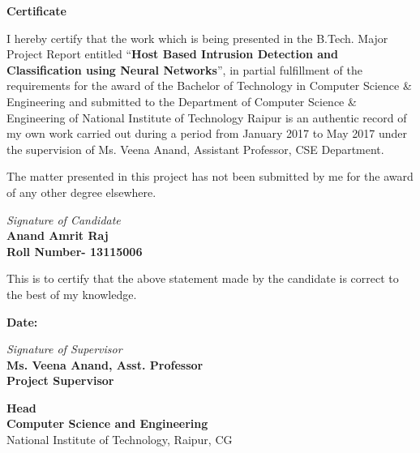 \documentclass[12pt]{article}
\newcommand{\projectTitle}{Host Based Intrusion Detection and Classification using Neural Networks}
\newcommand{\quotes}[1]{``#1''}
\theoremstyle{definition}
\begin{document}
	
	\begin{titlepage}
		
		\textbf{%
			\hfill
			\Large Certificate \hfill\hfill\\
		}
		\vspace{15pt}
		
		I hereby certify that the work which is being presented in the B.Tech. Major Project Report entitled \quotes{\textbf{\projectTitle}}, in partial fulfillment of the requirements for the award of the Bachelor  of Technology in Computer Science \& Engineering and submitted to the Department of Computer Science \& Engineering of National Institute of Technology Raipur  is an authentic record of my own work carried out during a period from January 2017 to May 2017 under the supervision of  Ms. Veena Anand, Assistant Professor, CSE Department. 

		The matter presented in this project has not been submitted by me for the award of any other degree elsewhere.\\
		[.25in]
		\begin{flushright}
			\textit{Signature of Candidate}\\
				\textbf{Anand Amrit Raj \\
				Roll Number- 13115006\\}
		\end{flushright}
	\vspace{10pt}
	This is to certify that the above statement made by the candidate is correct to the best of my knowledge.

		\begin{flushleft}
			\textbf{Date:}
		\end{flushleft}
		\begin{flushright}
			\textit{Signature of Supervisor}\\
				\textbf{Ms. Veena Anand, Asst. Professor\\
				Project Supervisor\\}
		\end{flushright}
		\vspace{30pt}
		\begin{flushleft}
			\textbf{\large Head}\\
			\textbf{Computer Science and Engineering}\\
			National Institute of Technology, Raipur, CG
		\end{flushleft}
	\end{titlepage}
	
\end{document}

